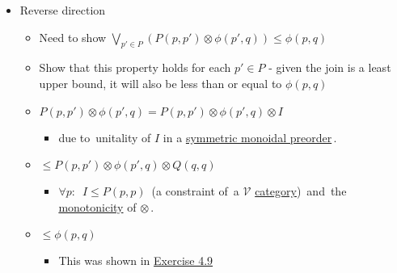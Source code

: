 \begin{itemize}
\begin{itemize}
\begin{itemize}
                  \end{itemize}
          \end{itemize}
    \item Reverse direction
          \begin{itemize}
            \item Need to show $\underset{p' \in P}\bigvee(P(p,p')\otimes \phi(p',q)) \leq \phi(p,q)$
            \item Show that this property holds for each $p' \in P$ - given the join is a least upper bound, it will also be less than or equal to $\phi(p,q)$
            \item $P(p,p')\otimes\phi(p',q) = P(p,p')\otimes\phi(p',q)\otimes I$
                  \begin{itemize}
                    \item due to \,unitality of $I$ in a \href{doc/1 math/Seven Sketches in Compositionality/Chapter 2: Resource theories/2 Symmetric monoidal preorders/1 Definition and first examples/1 Symmetric monoidal structure on a preorder}{symmetric monoidal preorder}\,.
                  \end{itemize}
            \item $\leq P(p,p')\otimes \phi(p',q)\otimes Q(q,q)$
                  \begin{itemize}
                    \item $\forall p:$ \,$I \leq P(p,p)$\, (a constraint of \,a $\mathcal{V}$ \href{doc/1 math/Seven Sketches in Compositionality/Chapter 2: Resource theories/3 Enrichment/1 V-categories/1 V-category}{category})\, and \,the \href{doc/1 math/Seven Sketches in Compositionality/Chapter 2: Resource theories/2 Symmetric monoidal preorders/1 Definition and first examples/1 Symmetric monoidal structure on a preorder}{monotonicity} of $\otimes$\,.
                  \end{itemize}
            \item $\leq\phi(p,q)$
                  \begin{itemize}
                    \item This was shown in \href{doc/1 math/Seven Sketches in Compositionality/Chapter 4: Co-design/2 Enriched profunctors/2 V-profunctors/4 Exercise 4-9}{Exercise 4.9}
                  \end{itemize}
          \end{itemize}

  \end{itemize}
